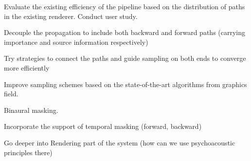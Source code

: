 


Evaluate the existing efficiency of the pipeline based on the distribution of paths in the existing renderer.
Conduct user study.

Decouple the propagation to include both backward and forward paths (carrying importance and source information respectively)

Try strategies to connect the paths and guide sampling on both ends to converge more efficiently

Improve sampling schemes based on the state-of-the-art algorithms from graphics field.

Binaural masking.

Incorporate the support of temporal masking (forward, backward)

Go deeper into Rendering part of the system (how can we use psychoacoustic principles there)
